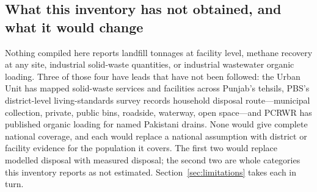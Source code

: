 \subsection{What this inventory has not obtained, and what it would change}

Nothing compiled here reports landfill tonnages at facility level, methane recovery at any
site, industrial solid-waste quantities, or industrial wastewater organic loading. Three of
those four have leads that have not been followed: the Urban Unit has mapped solid-waste
services and facilities across Punjab's tehsils, PBS's district-level living-standards survey
records household disposal route---municipal collection, private, public bins, roadside,
waterway, open space---and PCRWR has published organic loading for named Pakistani drains.
None would give complete national coverage, and each would replace a national assumption with
district or facility evidence for the population it covers. The first two
would replace modelled disposal with measured disposal; the second two are whole categories
this inventory reports as not estimated. Section~\ref{sec:limitations} takes each in turn.
